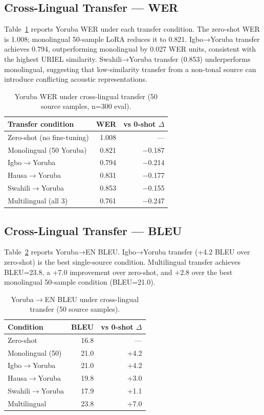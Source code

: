 \documentclass[11pt,a4paper]{article}
\begin{document}
\subsection{Cross-Lingual Transfer — WER}

Table~\ref{tab:transfer_wer} reports Yoruba WER under each transfer condition. The zero-shot WER is 1.008; monolingual 50-sample LoRA reduces it to 0.821. Igbo→Yoruba transfer achieves 0.794, outperforming monolingual by 0.027 WER units, consistent with the highest URIEL similarity. Swahili→Yoruba transfer (0.853) underperforms monolingual, suggesting that low-similarity transfer from a non-tonal source can introduce conflicting acoustic representations.

\begin{table}[t]
\centering
\small
\caption{Yoruba WER under cross-lingual transfer (50 source samples, n=300 eval).}
\label{tab:transfer_wer}
\begin{tabular}{lrr}
\toprule
\textbf{Transfer condition} & \textbf{WER} & \textbf{vs 0-shot $\Delta$} \\
\midrule
Zero-shot (no fine-tuning)  & 1.008 & — \\
Monolingual (50 Yoruba)     & 0.821 & $-$0.187 \\
Igbo$\to$Yoruba             & 0.794 & $-$0.214 \\
Hausa$\to$Yoruba            & 0.831 & $-$0.177 \\
Swahili$\to$Yoruba          & 0.853 & $-$0.155 \\
Multilingual (all 3)        & 0.761 & $-$0.247 \\
\bottomrule
\end{tabular}
\end{table}

\subsection{Cross-Lingual Transfer — BLEU}

Table~\ref{tab:transfer_bleu} reports Yoruba→EN BLEU. Igbo→Yoruba transfer (+4.2 BLEU over zero-shot) is the best single-source condition. Multilingual transfer achieves BLEU=23.8, a +7.0 improvement over zero-shot, and +2.8 over the best monolingual 50-sample condition (BLEU=21.0).

\begin{table}[t]
\centering
\small
\caption{Yoruba$\to$EN BLEU under cross-lingual transfer (50 source samples).}
\label{tab:transfer_bleu}
\begin{tabular}{lrr}
\toprule
\textbf{Condition} & \textbf{BLEU} & \textbf{vs 0-shot $\Delta$} \\
\midrule
Zero-shot         & 16.8 & — \\
Monolingual (50)  & 21.0 & +4.2 \\
Igbo$\to$Yoruba   & 21.0 & +4.2 \\
Hausa$\to$Yoruba  & 19.8 & +3.0 \\
Swahili$\to$Yoruba & 17.9 & +1.1 \\
Multilingual      & 23.8 & +7.0 \\
\bottomrule
\end{tabular}
\end{table}
\end{document}
